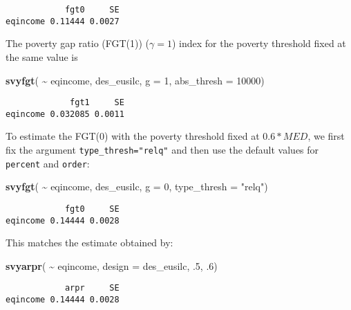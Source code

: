 \documentclass[
]{book}
\newenvironment{Shaded}{\begin{snugshade}}{\end{snugshade}}
\newcommand{\AttributeTok}[1]{\textcolor[rgb]{0.13,0.29,0.53}{#1}}
\newcommand{\DecValTok}[1]{\textcolor[rgb]{0.00,0.00,0.81}{#1}}
\newcommand{\FunctionTok}[1]{\textcolor[rgb]{0.13,0.29,0.53}{\textbf{#1}}}
\newcommand{\NormalTok}[1]{#1}
\newcommand{\SpecialCharTok}[1]{\textcolor[rgb]{0.81,0.36,0.00}{\textbf{#1}}}
\newcommand{\StringTok}[1]{\textcolor[rgb]{0.31,0.60,0.02}{#1}}
\begin{document}
\begin{verbatim}
            fgt0     SE
eqincome 0.11444 0.0027
\end{verbatim}

The poverty gap ratio (FGT(1)) (\(\gamma=1\)) index for the poverty threshold fixed at the same value is

\begin{Shaded}
\begin{Highlighting}[]
\FunctionTok{svyfgt}\NormalTok{( }\SpecialCharTok{\textasciitilde{}}\NormalTok{ eqincome, des\_eusilc, }\AttributeTok{g =} \DecValTok{1}\NormalTok{, }\AttributeTok{abs\_thresh =} \DecValTok{10000}\NormalTok{)}
\end{Highlighting}
\end{Shaded}

\begin{verbatim}
             fgt1     SE
eqincome 0.032085 0.0011
\end{verbatim}

To estimate the FGT(0) with the poverty threshold fixed at \(0.6* MED\), we first fix the argument \texttt{type\_thresh="relq"} and then use the default values for \texttt{percent} and \texttt{order}:

\begin{Shaded}
\begin{Highlighting}[]
\FunctionTok{svyfgt}\NormalTok{( }\SpecialCharTok{\textasciitilde{}}\NormalTok{ eqincome, des\_eusilc, }\AttributeTok{g =} \DecValTok{0}\NormalTok{, }\AttributeTok{type\_thresh =} \StringTok{"relq"}\NormalTok{)}
\end{Highlighting}
\end{Shaded}

\begin{verbatim}
            fgt0     SE
eqincome 0.14444 0.0028
\end{verbatim}

This matches the estimate obtained by:

\begin{Shaded}
\begin{Highlighting}[]
\FunctionTok{svyarpr}\NormalTok{( }\SpecialCharTok{\textasciitilde{}}\NormalTok{ eqincome, }\AttributeTok{design =}\NormalTok{ des\_eusilc, .}\DecValTok{5}\NormalTok{, .}\DecValTok{6}\NormalTok{)}
\end{Highlighting}
\end{Shaded}

\begin{verbatim}
            arpr     SE
eqincome 0.14444 0.0028
\end{verbatim}
\end{document}
